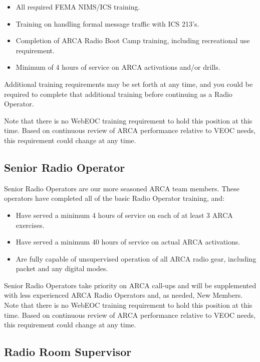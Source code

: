 \documentclass[pdflatex,letterpaper,twoside,12pt]{book}
\begin{document}
\begin{itemize}
	\item All required FEMA NIMS/ICS training.
	\item Training on handling formal message traffic with ICS 213's.
	\item Completion of ARCA Radio Boot Camp training, including recreational use requirement.
	\item Minimum of 4 hours of service on ARCA activations and/or drills.
\end{itemize}

Additional training requirements may be set forth at any time, and you could be required to complete that additional training before continuing as a Radio Operator.

Note that there is no WebEOC training requirement to hold this position at this time.  Based on continuous review of ARCA performance relative to VEOC needs, this requirement could change at any time.

\subsection{Senior Radio Operator}

Senior Radio Operators are our more seasoned ARCA team members.  These operators have completed all of the basic Radio Operator training, and:

\begin{itemize}
	\item Have served a minimum 4 hours of service on each of at least 3 ARCA exercises.
	\item Have served a minimum 40 hours of service on actual ARCA activations.
	\item Are fully capable of unsupervised operation of all ARCA radio gear, including packet and any digital modes.
\end{itemize}

Senior Radio Operators take priority on ARCA call-ups and will be supplemented with less experienced ARCA Radio Operators and, as needed, New Members.
Note that there is no WebEOC training requirement to hold this position at this time.  Based on continuous review of ARCA performance relative to VEOC needs, this requirement could change at any time.

\subsection{Radio Room Supervisor}
\end{document}
